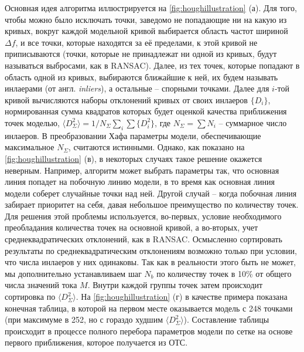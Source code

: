 \documentclass[14pt, a4paper]{extreport}
\numberwithin{equation}{section}
\begin{document}
	Основная идея алгоритма иллюстрируется на \autoref{fig:houghillustration} (а). Для того, чтобы можно было исключать точки, заведомо не попадающие ни на какую из кривых, вокруг каждой модельной кривой выбирается область частот шириной $\Delta f$, и все точки, которые находятся за её пределами, к этой кривой не приписываются (точки, которые не принадлежат ни одной из кривых, будут называться выбросами, как в RANSAC). Далее, из тех точек, которые попадают в область одной из кривых, выбираются ближайшие к ней, их будем называть инлаерами (от англ. \foreignlanguage{english}{\textit{inliers}}), а остальные -- спорными точками.  Далее для $i$-той кривой вычисляются наборы отклонений кривых от своих инлаеров $\{D_i\}$, нормированная сумма квадратов которых будет оценкой качества приближения точек моделью, $\langle D^2_\Sigma\rangle = 1/N_\Sigma \sum_i \sum \{D_i^2\}$, где $N_\Sigma = \sum N_i$ -- суммарное число инлаеров. В преобразовании Хафа параметры модели, обеспечивающие максимальное $N_\Sigma$, считаются истинными. Однако, как показано на \autoref{fig:houghillustration} (в), в некоторых случаях такое решение окажется неверным. Например, алгоритм может выбрать параметры так, что основная линия попадет на побочную линию модели, в то время как основная линия модели соберет случайные точки над ней. Другой случай -- когда побочная линия забирает приоритет на себя, давая небольшое преимущество по количеству точек. Для решения этой проблемы используется, во-первых, условие необходимого преобладания количества точек на основной кривой, а во-вторых, учет среднеквадратических отклонений, как в RANSAC. Осмысленно сортировать результаты по среднеквадратическим отклонениям возможно только при условии, что числа инлаеров у них одинаковы. Так как в реальности этого быть не может, мы дополнительно устанавливаем шаг $N_b$ по количеству точек в 10\% от общего числа значений тока $M$. Внутри каждой группы точек затем происходит сортировка по $\langle D^2_\Sigma\rangle$. На \autoref{fig:houghillustration} (г) в качестве примера показана конечная таблица, в которой на первом месте оказывается модель с 248 точками (при максимуме в 252, но с гораздо худшим $\langle D^2_\Sigma\rangle$). 
	Составление таблицы происходит в процессе полного перебора параметров модели по сетке на основе первого приближения, которое получается из ОТС.
	
\end{document}
